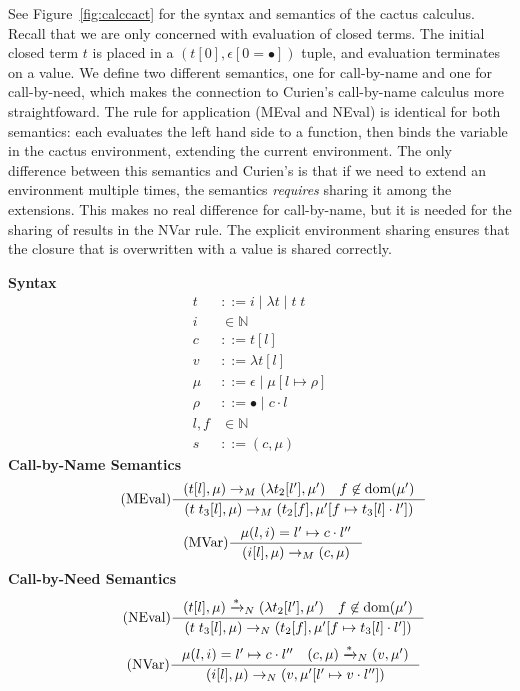 See Figure~\ref{fig:calccact} for the syntax and semantics of the cactus
calculus. Recall that we are only concerned with evaluation of closed terms. The
initial closed term $t$ is placed in a $(t[0],\epsilon[0=\bullet])$ tuple, and
evaluation terminates on a value. We define two different semantics, one for
call-by-name and one for call-by-need, which makes the connection to
Curien's call-by-name calculus more straightfoward. The rule for application
(MEval and NEval) is identical for both semantics: each evaluates the left hand
side to a function, then binds the variable in the cactus environment, extending
the current environment.
The only difference between this semantics and Curien's is that if we need
to extend an environment multiple times, the semantics \emph{requires}
sharing it among the extensions. This makes no real difference for call-by-name,
but it is needed for the sharing of results in the NVar rule. The explicit
environment sharing ensures that the closure that is overwritten with a value is
shared correctly.

\begin{figure*}
\textbf{Syntax}
\begin{align*}
\tag{Term} t &::= i \; | \; \lambda t \; | \; t \; t  \\
\tag{Variable} i &\in \mathbb{N}  \\
\tag{Closure} c &::= t [l] \\
\tag{Value} v &::= \lambda t [l] \\
\tag{Heap} \mu &::= \epsilon \; | \; \mu [ l \mapsto \rho ] \\
\tag{Environment} \rho &::= \bullet \; | \; c \cdot l \\
\tag{Location} l,f &\in \mathbb{N}  \\
\tag{State} s &::= (c, \mu)
\end{align*}
\textbf{Call-by-Name Semantics}
\begin{align*}
\tag{MEval} \inference
{(t[l], \mu) \rightarrow_{M} (\lambda t_2[l'], \mu') \quad f \not \in \textnormal{dom}(\mu')}
{(t \; t_3[l], \mu) \rightarrow_{M} (t_2[f], \mu'[f \mapsto t_3[l] \cdot l'])}  
\end{align*}
\begin{align*}
\tag{MVar} \inference 
{\mu(l, i) = l' \mapsto c \cdot l''}
{(i[l],\mu) \rightarrow_M (c,\mu)}
\end{align*}
\textbf{Call-by-Need Semantics}
\begin{align*}
\tag{NEval} \inference
{(t[l], \mu) \xrightarrow{* }_{N} (\lambda t_2[l'], \mu') \quad f \not \in \textnormal{dom}(\mu')}
{(t \; t_3[l], \mu) \rightarrow_{N} (t_2[f], \mu'[f \mapsto t_3[l] \cdot l'])}  
\end{align*}
\begin{align*}
\tag{NVar} \inference
{\mu(l, i) = l' \mapsto c \cdot l'' \quad (c, \mu) \xrightarrow{* }_{N} (v, \mu')}
{(i[l],\mu) \rightarrow_N (v, \mu'[l' \mapsto v \cdot l''])}
\end{align*}
\caption{Cactus calculus syntax and semantics.}
\label{fig:calccact}
\end{figure*}

